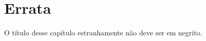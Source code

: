 \documentclass[monografia.tex]{subfiles}
\begin{document}
	\chapter*{Errata}
	O título desse capítulo estranhamente não deve ser em negrito.
\end{document}
